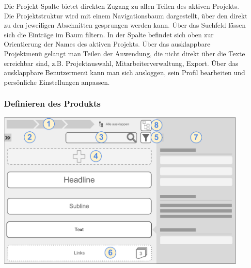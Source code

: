 Die Projekt-Spalte  bietet direkten Zugang zu allen Teilen des aktiven Projekts. Die Projektstruktur wird mit einem Navigationsbaum dargestellt, über den direkt zu den jeweiligen Abschnitten gesprungen werden kann. Über das Suchfeld lässen sich die Einträge im Baum filtern. In der Spalte befindet sich oben zur Orientierung der Names des aktiven Projekts. Über das ausklappbare Projektmenü gelangt man Teilen der Anwendung, die nicht direkt über die Texte erreichbar sind, z.B. Projektauswahl, Mitarbeiterverwaltung, Export. Über das ausklappbare Benutzermenü kann man sich ausloggen, sein Profil bearbeiten und persönliche Einstellungen anpassen.

\pagebreak

\subsubsection{Definieren des Produkts}\label{l:gui-definition}

\begin{center}
\includegraphics[width=0.95\textwidth]{media/GUIProduktstruktur.pdf}
\label{chart:gui-produktstruktur}
\end{center}

